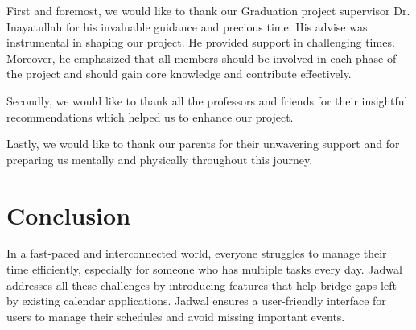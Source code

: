 \documentclass[12pt,a4paper,twoside]{report}
\begin{document}
\begin{singlespace}
    \begin{justify}
        First and foremost, we would like to thank our Graduation project supervisor Dr. Inayatullah for his invaluable guidance and precious time. His advise was instrumental in shaping our project. He provided support in challenging times. Moreover, he emphasized that all members should be involved in each phase of the project and should gain core knowledge and contribute effectively.

        Secondly, we would like to thank all the professors and friends for their insightful recommendations which helped us to enhance our project.

        Lastly, we would like to thank our parents for their unwavering support and for preparing us mentally and physically throughout this journey.
    \end{justify}

    \cleardoublepage

    \tableofcontents

    \cleardoublepage

    \listoffigures

    \cleardoublepage

    \listoftables

    \glsaddall
    \printglossary[title={List of Abbreviations and Terminology}]

\end{singlespace}

\cleardoublepage










\chapter*{Conclusion}

In a fast-paced and interconnected world, everyone struggles to manage their time efficiently, especially for someone who has multiple tasks every day. Jadwal addresses all these challenges by introducing features that help bridge gaps left by existing calendar applications. Jadwal ensures a user-friendly interface for users to manage their schedules and avoid missing important events.
\end{document}
